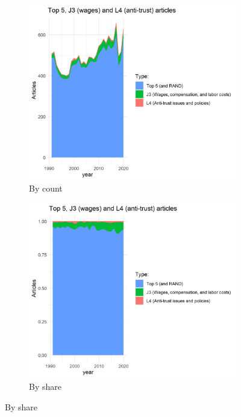 \documentclass[11pt, letterpaper, twoside]{article}
\begin{document}
\begin{figure}[h]
    \begin{subfigure}[h]{0.49\textwidth}
        \centering
        \includegraphics[width=\textwidth]{j3-l4-top5.png}
        \caption{By count}
    \end{subfigure}
    \hfill
    \begin{subfigure}[h]{0.49\textwidth}
        \centering
        \includegraphics[width=\textwidth]{j3-l4-top5-normalized.png}
        \caption{By share}
    \end{subfigure}
\end{figure}
\end{document}
